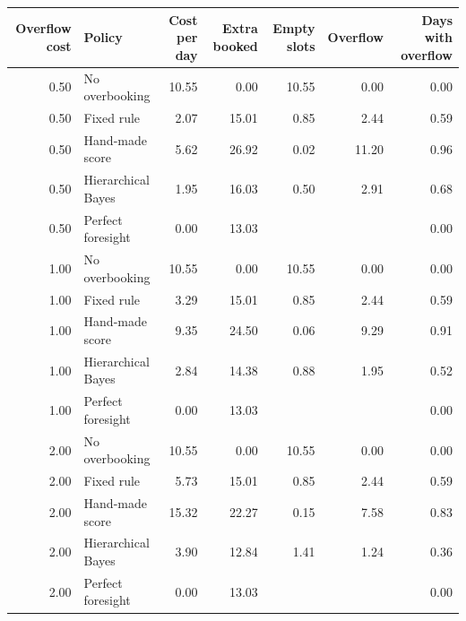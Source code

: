 \begin{tabular}{rlrrrrr}
\toprule
Overflow cost & Policy & Cost per day & Extra booked & Empty slots & Overflow & Days with overflow \\
\midrule
0.50 & No overbooking & 10.55 & 0.00 & 10.55 & 0.00 & 0.00 \\
0.50 & Fixed rule & 2.07 & 15.01 & 0.85 & 2.44 & 0.59 \\
0.50 & Hand-made score & 5.62 & 26.92 & 0.02 & 11.20 & 0.96 \\
0.50 & Hierarchical Bayes & 1.95 & 16.03 & 0.50 & 2.91 & 0.68 \\
0.50 & Perfect foresight & 0.00 & 13.03 &  &  & 0.00 \\
1.00 & No overbooking & 10.55 & 0.00 & 10.55 & 0.00 & 0.00 \\
1.00 & Fixed rule & 3.29 & 15.01 & 0.85 & 2.44 & 0.59 \\
1.00 & Hand-made score & 9.35 & 24.50 & 0.06 & 9.29 & 0.91 \\
1.00 & Hierarchical Bayes & 2.84 & 14.38 & 0.88 & 1.95 & 0.52 \\
1.00 & Perfect foresight & 0.00 & 13.03 &  &  & 0.00 \\
2.00 & No overbooking & 10.55 & 0.00 & 10.55 & 0.00 & 0.00 \\
2.00 & Fixed rule & 5.73 & 15.01 & 0.85 & 2.44 & 0.59 \\
2.00 & Hand-made score & 15.32 & 22.27 & 0.15 & 7.58 & 0.83 \\
2.00 & Hierarchical Bayes & 3.90 & 12.84 & 1.41 & 1.24 & 0.36 \\
2.00 & Perfect foresight & 0.00 & 13.03 &  &  & 0.00 \\
\bottomrule
\end{tabular}
